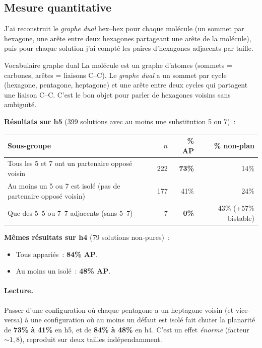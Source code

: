 \documentclass[11pt,a4paper]{article}
\begin{document}
\subsection{Mesure quantitative}

J'ai reconstruit le \emph{graphe dual} hex--hex pour chaque molécule (un sommet par hexagone, une arête entre deux hexagones partageant une arête de la molécule), puis pour chaque solution j'ai compté les paires d'hexagones adjacents par taille.

\begin{encadre}{Vocabulaire \og graphe dual \fg{}}
La molécule est un graphe d'atomes (sommets = carbones, arêtes = liaisons C--C). Le \emph{graphe dual} a un sommet par cycle (hexagone, pentagone, heptagone) et une arête entre deux cycles qui partagent une liaison C--C. C'est le bon objet pour parler de \og hexagones voisins \fg{} sans ambiguïté.
\end{encadre}

\textbf{Résultats sur h5} (399 solutions avec au moins une substitution 5 ou 7)~:

\begin{center}
\begin{tabular}{@{}lrrr@{}}
\toprule
\textbf{Sous-groupe} & \textbf{$n$} & \textbf{\% AP} & \textbf{\% non-plan} \\
\midrule
Tous les 5 et 7 ont un partenaire opposé voisin    & 222 & \textbf{73\%} & 14\% \\
Au moins un 5 ou 7 est isolé (pas de partenaire opposé voisin) & 177 & 41\%          & 24\% \\
Que des 5--5 ou 7--7 adjacents (sans 5--7)         &   7 & \textbf{0\%}  & 43\% (+57\% bistable) \\
\bottomrule
\end{tabular}
\end{center}

\textbf{Mêmes résultats sur h4} (79 solutions non-pures)~:
\begin{itemize}[leftmargin=2em,itemsep=0.2em]
  \item Tous appariés~: \textbf{84\% AP}.
  \item Au moins un isolé~: \textbf{48\% AP}.
\end{itemize}

\paragraph{Lecture.}
Passer d'une configuration où chaque pentagone a un heptagone voisin (et vice-versa) à une configuration où au moins un défaut est isolé fait chuter la planarité de \textbf{73\% à 41\%} en h5, et de \textbf{84\% à 48\%} en h4. C'est un effet \emph{énorme} (facteur ${\sim}1{,}8$), reproduit sur deux tailles indépendamment.
\end{document}

